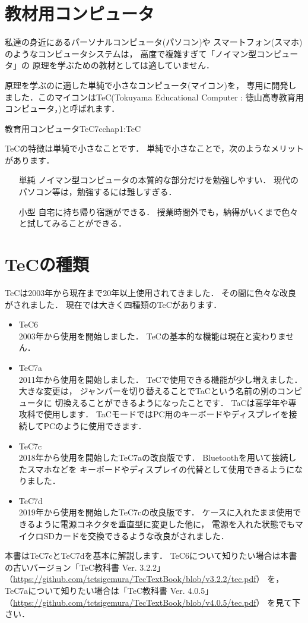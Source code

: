 \section{教材用コンピュータ}

私達の身近にあるパーソナルコンピュータ(パソコン)や
スマートフォン(スマホ)のようなコンピュータシステムは，
高度で複雑すぎて「ノイマン型コンピュータ」の
原理を学ぶための教材としては適していません．

原理を学ぶのに適した単純で小さなコンピュータ(マイコン)を，
専用に開発しました．このマイコンはTeC(Tokuyama Educational
Computer : 徳山高専教育用コンピュータ，)と呼ばれます．

{教育用コンピュータTeC7c}{chap1:TeC}

TeCの特徴は単純で小さなことです．
単純で小さなことで，次のようなメリットがあります．

\begin{itemize}
\item[単純]
ノイマン型コンピュータの本質的な部分だけを勉強しやすい．
現代のパソコン等は，勉強するには難しすぎる．
\item[小型]
自宅に持ち帰り宿題ができる．
授業時間外でも，納得がいくまで色々と試してみることができる．
\end{itemize}

\section{TeCの種類}

TeCは2003年から現在まで20年以上使用されてきました．
その間に色々な改良がされました．
現在では大きく四種類のTeCがあります．

\begin{itemize}
\item TeC6 \\
2003年から使用を開始しました．
TeCの基本的な機能は現在と変わりません．
\item TeC7a \\
2011年から使用を開始しました．
TeCで使用できる機能が少し増えました．
大きな変更は，
ジャンパーを切り替えることでTaCという名前の別のコンピュータに
切換えることができるようになったことです．
TaCは高学年や専攻科で使用します．
TaCモードではPC用のキーボードやディスプレイを接続してPCのように使用できます．
\item TeC7c \\
2018年から使用を開始したTeC7aの改良版です．
Bluetoothを用いて接続したスマホなどを
キーボードやディスプレイの代替として使用できるようになりました．
\item TeC7d \\
2019年から使用を開始したTeC7cの改良版です．
ケースに入れたまま使用できるように電源コネクタを垂直型に変更した他に，
電源を入れた状態でもマイクロSDカードを交換できるような改良がされました．
\end{itemize}

本書はTeC7cとTeC7dを基本に解説します．
TeC6について知りたい場合は本書の古いバージョン「TeC教科書 Ver. 3.2.2」
（\url{https://github.com/tctsigemura/TecTextBook/blob/v3.2.2/tec.pdf}）
を，
TeC7aについて知りたい場合は「TeC教科書 Ver. 4.0.5」
（\url{https://github.com/tctsigemura/TecTextBook/blob/v4.0.5/tec.pdf}）
を見て下さい．
